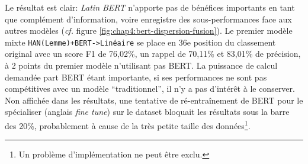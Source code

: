 Le résultat est clair: \textit{Latin BERT} n'apporte pas de bénéfices importants en tant que complément d'information, voire enregistre des sous-performances face aux autres modèles (\textit{cf.} figure \ref{fig:chap4:bert-dispersion-fusion}). Le premier modèle mixte \texttt{HAN(Lemme)+BERT->Linéaire} se place en 36e position du classement original avec un score F1 de 76,02\%, un rappel de 70,11\% et 83,01\% de précision, à 2 points du premier modèle n'utilisant pas BERT. La puissance de calcul demandée part BERT étant importante, si ses performances ne sont pas compétitives avec un modèle \enquote{traditionnel}, il n'y a pas d'intérêt à le conserver. Non affichée dans les résultats, une tentative de ré-entraînement de BERT pour le spécialiser (anglais \textit{fine tune}) sur le dataset bloquait les résultats sous la barre des 20\%, probablement à cause de la très petite taille des données\footnote{Un problème d'implémentation ne peut être exclu.}.

